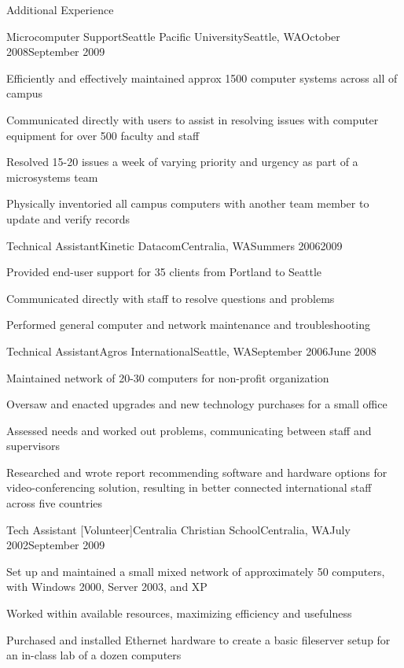 \documentclass[letterpaper,10pt]{article}
\newcommand{\optarg}[2][]{%
  \ifthenelse{\isempty{#1}}%
    {}%
    {#2}%
}
\newenvironment{res_section}[1]{%
  \vskip 6pt
  \noindent
  {\Large \textbf{#1}}\\
  \rule[8pt]{\textwidth}{0.5pt}
  \vskip -8pt
}{
}
\newenvironment{res_subsection}[1]{%
  \vskip 4pt
  \noindent
  \textbf{\large{#1}}
  \begin{itemize}
}{
  \end{itemize}
}
\newenvironment{res_experienceitem}[5]{%
  \begin{res_subsection}{#1 - \em{%
  #2%
  \optarg[#3]{, #3}%
  \optarg[#4]{, #4}%
  \optarg[#5]{ -- #5}%
  }}
}{
  \end{res_subsection}
}
\begin{document}
\begin{res_section}{Additional Experience}
\begin{res_experienceitem}{Microcomputer Support}{Seattle Pacific University}{Seattle, WA}{October 2008}{September 2009}
  \item Efficiently and effectively maintained approx 1500 computer systems across all of campus
  \item Communicated directly with users to assist in resolving issues with computer equipment for over 500 faculty and staff
  \item Resolved 15-20 issues a week of varying priority and urgency as part of a microsystems team
  \item Physically inventoried all campus computers with another team member to update and verify records
\end{res_experienceitem}
\begin{res_experienceitem}{Technical Assistant}{Kinetic Datacom}{Centralia, WA}{Summers 2006}{2009}
  \item Provided end-user support for 35 clients from Portland to Seattle
  \item Communicated directly with staff to resolve questions and problems
  \item Performed general computer and network maintenance and troubleshooting
\end{res_experienceitem}
\begin{res_experienceitem}{Technical Assistant}{Agros International}{Seattle, WA}{September 2006}{June 2008}
  \item Maintained network of 20-30 computers for non-profit organization
  \item Oversaw and enacted upgrades and new technology purchases for a small office
  \item Assessed needs and worked out problems, communicating between staff and supervisors
  \item Researched and wrote report recommending software and hardware options for video-conferencing solution, resulting in better connected international staff across five countries
\end{res_experienceitem}
\begin{res_experienceitem}{Tech Assistant [Volunteer]}{Centralia Christian School}{Centralia, WA}{July 2002}{September 2009}
  \item Set up and maintained a small mixed network of approximately 50 computers, with Windows 2000, Server 2003, and XP
  \item Worked within available resources, maximizing efficiency and usefulness
  \item Purchased and installed Ethernet hardware to create a basic fileserver setup for an in-class lab of a dozen computers
\end{res_experienceitem}
\end{res_section}
\end{document}
